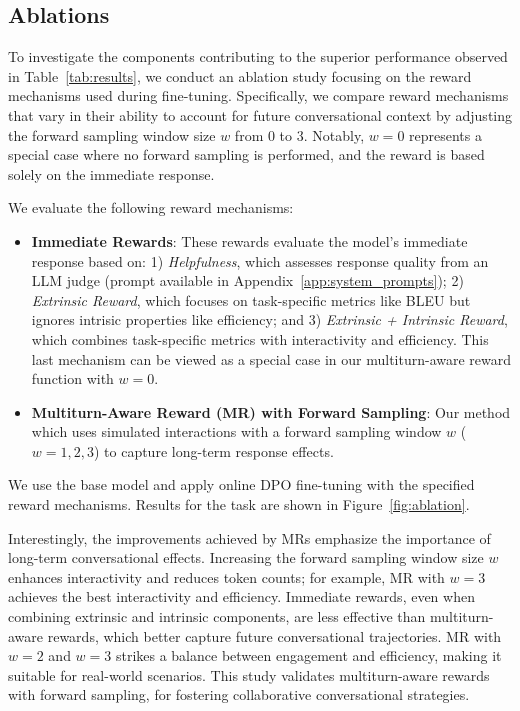 \subsection{Ablations}
\label{sec:ablation}

To investigate the components contributing to the superior performance observed in Table~\ref{tab:results}, we conduct an ablation study focusing on the reward mechanisms used during fine-tuning. Specifically, we compare reward mechanisms that vary in their ability to account for future conversational context by adjusting the forward sampling window size $w$ from 0 to 3. Notably, $w=0$ represents a special case where no forward sampling is performed, and the reward is based solely on the immediate response.

We evaluate the following reward mechanisms:
\begin{itemize}%
     \item \textbf{Immediate Rewards}: These rewards evaluate the model's immediate response based on:
        1) \textit{Helpfulness}, which assesses response quality from an LLM judge (prompt available in Appendix~\ref{app:system_prompts}); 
        2) \textit{Extrinsic Reward}, which focuses on task-specific metrics like BLEU but ignores intrisic properties like efficiency; and 
        3) \textit{Extrinsic + Intrinsic Reward}, which combines task-specific metrics with interactivity and efficiency. This last mechanism can be viewed as a special case in our multiturn-aware reward function with $w=0$.
    
    \item \textbf{Multiturn-Aware Reward (MR) with Forward Sampling}: Our method which uses simulated interactions with a forward sampling window $w$ ($w=1,2,3$) to capture long-term response effects.
\end{itemize}

We use the \llama base model and apply online DPO fine-tuning with the specified reward mechanisms. Results for the \doc task are shown in Figure~\ref{fig:ablation}.

Interestingly,
the improvements achieved by MRs emphasize the importance of long-term conversational effects. Increasing the forward sampling window size $w$ enhances interactivity and reduces token counts; for example, MR with $w=3$ achieves the best interactivity and efficiency. Immediate rewards, even when combining extrinsic and intrinsic components, are less effective than multiturn-aware rewards, which better capture future conversational trajectories. MR with $w=2$ and $w=3$ strikes a balance between engagement and efficiency, making it suitable for real-world scenarios. This study validates multiturn-aware rewards with forward sampling, for fostering collaborative conversational strategies.

